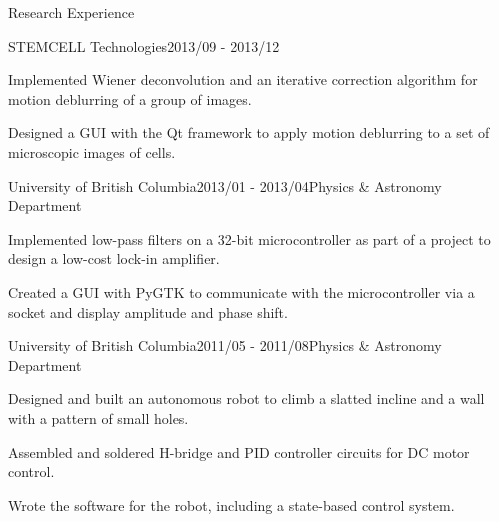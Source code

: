 \documentclass{resume} %
\begin{document}
\begin{rSection}{Research Experience}

\begin{rSubsection}{STEMCELL Technologies}{2013/09 - 2013/12}{}{}
\item Implemented Wiener deconvolution and an iterative correction algorithm for motion deblurring of a group of images.
\item Designed a GUI with the Qt framework to apply motion deblurring to a set of microscopic images of cells.
\end{rSubsection}

\begin{rSubsection}{University of British Columbia}{2013/01 - 2013/04}{Physics \& Astronomy Department}{}
\item Implemented low-pass filters on a 32-bit microcontroller as part of a project to design a low-cost lock-in amplifier.
\item Created a GUI with PyGTK to communicate with the microcontroller via a socket and display amplitude and phase shift.
\end{rSubsection}

\begin{rSubsection}{University of British Columbia}{2011/05 - 2011/08}{Physics \& Astronomy Department}{}
\item Designed and built an autonomous robot to climb a slatted incline and a wall with a pattern of small holes.
\item Assembled and soldered H-bridge and PID controller circuits for DC motor control.
\item Wrote the software for the robot, including a state-based control system.
\end{rSubsection}

\end{rSection}




\end{document}
